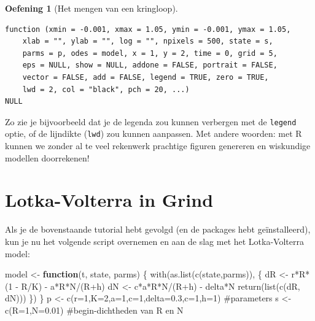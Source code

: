 \documentclass[
  a4paper,
]{scrbook}
\newenvironment{Shaded}{\begin{snugshade}}{\end{snugshade}}
\newcommand{\AttributeTok}[1]{\textcolor[rgb]{0.40,0.45,0.13}{#1}}
\newcommand{\CommentTok}[1]{\textcolor[rgb]{0.37,0.37,0.37}{#1}}
\newcommand{\ControlFlowTok}[1]{\textcolor[rgb]{0.00,0.23,0.31}{\textbf{#1}}}
\newcommand{\DecValTok}[1]{\textcolor[rgb]{0.68,0.00,0.00}{#1}}
\newcommand{\FloatTok}[1]{\textcolor[rgb]{0.68,0.00,0.00}{#1}}
\newcommand{\FunctionTok}[1]{\textcolor[rgb]{0.28,0.35,0.67}{#1}}
\newcommand{\NormalTok}[1]{\textcolor[rgb]{0.00,0.23,0.31}{#1}}
\newcommand{\OtherTok}[1]{\textcolor[rgb]{0.00,0.23,0.31}{#1}}
\newcommand{\SpecialCharTok}[1]{\textcolor[rgb]{0.37,0.37,0.37}{#1}}
\theoremstyle{definition}
\newtheorem{exercise}{Oefening}[chapter]
\theoremstyle{remark}
\begin{document}
\begin{exercise}[Het mengen van een
kringloop]
\begin{verbatim}
function (xmin = -0.001, xmax = 1.05, ymin = -0.001, ymax = 1.05, 
    xlab = "", ylab = "", log = "", npixels = 500, state = s, 
    parms = p, odes = model, x = 1, y = 2, time = 0, grid = 5, 
    eps = NULL, show = NULL, addone = FALSE, portrait = FALSE, 
    vector = FALSE, add = FALSE, legend = TRUE, zero = TRUE, 
    lwd = 2, col = "black", pch = 20, ...) 
NULL
\end{verbatim}

Zo zie je bijvoorbeeld dat je de legenda zou kunnen verbergen met de
\texttt{legend} optie, of de lijndikte (\texttt{lwd}) zou kunnen
aanpassen. Met andere woorden: met R kunnen we zonder al te veel
rekenwerk prachtige figuren genereren en wiskundige modellen
doorrekenen!

\section{Lotka-Volterra in Grind}\label{lotka-volterra-in-grind}

Als je de bovenstaande tutorial hebt gevolgd (en de packages hebt
geïnstalleerd), kun je nu het volgende script overnemen en aan de slag
met het Lotka-Volterra model:

\begin{Shaded}
\begin{Highlighting}[numbers=left,,]
\NormalTok{model }\OtherTok{\textless{}{-}} \ControlFlowTok{function}\NormalTok{(t, state, parms) \{}
  \FunctionTok{with}\NormalTok{(}\FunctionTok{as.list}\NormalTok{(}\FunctionTok{c}\NormalTok{(state,parms)), \{}
\NormalTok{    dR }\OtherTok{\textless{}{-}}\NormalTok{ r}\SpecialCharTok{*}\NormalTok{R}\SpecialCharTok{*}\NormalTok{(}\DecValTok{1} \SpecialCharTok{{-}}\NormalTok{ R}\SpecialCharTok{/}\NormalTok{K) }\SpecialCharTok{{-}}\NormalTok{ a}\SpecialCharTok{*}\NormalTok{R}\SpecialCharTok{*}\NormalTok{N}\SpecialCharTok{/}\NormalTok{(R}\SpecialCharTok{+}\NormalTok{h)}
\NormalTok{    dN }\OtherTok{\textless{}{-}}\NormalTok{ c}\SpecialCharTok{*}\NormalTok{a}\SpecialCharTok{*}\NormalTok{R}\SpecialCharTok{*}\NormalTok{N}\SpecialCharTok{/}\NormalTok{(R}\SpecialCharTok{+}\NormalTok{h) }\SpecialCharTok{{-}}\NormalTok{ delta}\SpecialCharTok{*}\NormalTok{N}
    \FunctionTok{return}\NormalTok{(}\FunctionTok{list}\NormalTok{(}\FunctionTok{c}\NormalTok{(dR, dN)))  }
\NormalTok{  \}) }
\NormalTok{\}  }
\NormalTok{p }\OtherTok{\textless{}{-}} \FunctionTok{c}\NormalTok{(}\AttributeTok{r=}\DecValTok{1}\NormalTok{,}\AttributeTok{K=}\DecValTok{2}\NormalTok{,}\AttributeTok{a=}\DecValTok{1}\NormalTok{,}\AttributeTok{c=}\DecValTok{1}\NormalTok{,}\AttributeTok{delta=}\FloatTok{0.3}\NormalTok{,}\AttributeTok{c=}\DecValTok{1}\NormalTok{,}\AttributeTok{h=}\DecValTok{1}\NormalTok{)  }\CommentTok{\#parameters}
\NormalTok{s }\OtherTok{\textless{}{-}} \FunctionTok{c}\NormalTok{(}\AttributeTok{R=}\DecValTok{1}\NormalTok{,}\AttributeTok{N=}\FloatTok{0.01}\NormalTok{) }\CommentTok{\#begin{-}dichtheden van R en N  }


\end{Highlighting}
\end{Shaded}
\end{exercise}
\end{document}
